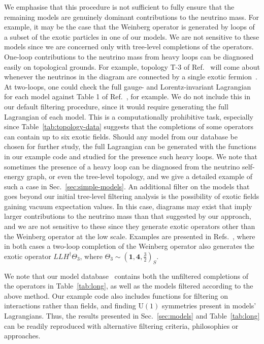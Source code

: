 We emphasise that this procedure is not sufficient to fully ensure that the
remaining models are genuinely dominant contributions to the neutrino mass. For
example, it may be the case that the Weinberg operator is generated by loops of
a subset of the exotic particles in one of our models. We are not sensitive to
these models since we are concerned only with tree-level completions of the
operators. One-loop contributions to the neutrino mass from heavy loops can be
diagnosed easily on topological grounds. For example, topology \textsf{T-3} of
Ref.~\cite{Bonnet:2009ej} will come about whenever the neutrinos in the diagram
are connected by a single exotic fermion~\cite{Angel:2012ug}. At two-loops, one
could check the full gauge- and Lorentz-invariant Lagrangian for each model
against Table 1 of Ref.~\cite{Sierra:2014rxa}, for example. We do not include
this in our default filtering procedure, since it would require generating the
full Lagrangian of each model. This is a computationally prohibitive task,
especially since Table~\ref{tab:topology-data} suggests that the completions of
some operators can contain up to six exotic fields. Should any model from our
database be chosen for further study, the full Lagrangian can be generated with
the functions in our example code and studied for the presence such heavy loops.
We note that sometimes the presence of a heavy loop can be diagnosed from the
neutrino self-energy graph, or even the tree-level topology, and we give a
detailed example of such a case in Sec.~\ref{sec:simple-models}. An additional
filter on the models that goes beyond our initial tree-level filtering analysis
is the possibility of exotic fields gaining vacuum expectation values. In this
case, diagrams may exist that imply larger contributions to the neutrino mass
than that suggested by our approach, and we are not sensitive to these since
they generate exotic operators other than the Weinberg operator at the low
scale. Examples are presented in Refs.~\cite{Popov:2019tyc, Babu:2020hun}, where
in both cases a two-loop completion of the Weinberg operator also generates the
exotic operator $LLH^{\dagger}\Theta_{3}$, where
$\Theta_{3} \sim (\mathbf{1}, \mathbf{4}, \tfrac{3}{2})_{S}$.

We note that our model database~\cite{gargalionis_john_2020_4054618} contains
both the unfiltered completions of the operators in Table~\ref{tab:long}, as
well as the models filtered according to the above method. Our example code also
includes functions for filtering on interactions rather than fields, and finding
$\mathrm{U}(1)$ symmetries present in models' Lagrangians. Thus, the results
presented in Sec.~\ref{sec:models} and Table~\ref{tab:long} can be readily
reproduced with alternative filtering criteria, philosophies or approaches.

